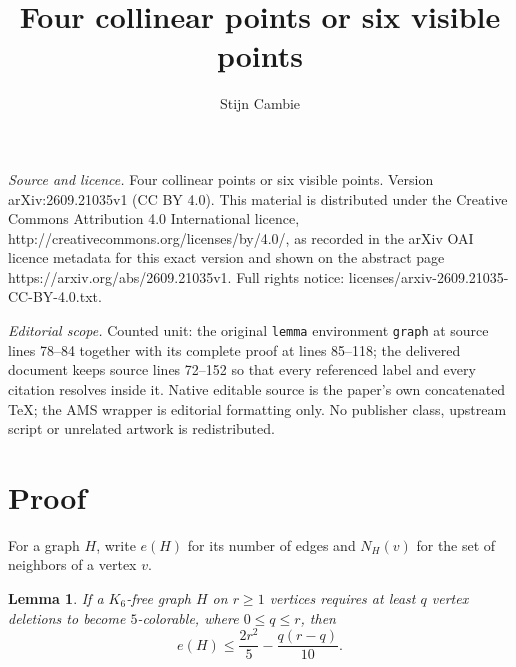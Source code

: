 \documentclass[10pt,a4paper]{amsart}
\newtheorem{lemma}[theorem]{Lemma}
\begin{document}
\title[Four collinear points or six visible points]{Four collinear points or six visible points}
\author{Stijn Cambie}
\date{}
\maketitle
\noindent\emph{Source and licence.} Four collinear points or six visible points. Version arXiv:2609.21035v1 (CC BY 4.0). This material is distributed under the Creative Commons Attribution 4.0 International licence, http://creativecommons.org/licenses/by/4.0/, as recorded in the arXiv OAI licence metadata for this exact version and shown on the abstract page https://arxiv.org/abs/2609.21035v1. Full rights notice: licenses/arxiv-2609.21035-CC-BY-4.0.txt.\par\smallskip
\noindent\textit{Editorial scope.} Counted unit: the original \texttt{lemma} environment \texttt{graph} at source lines 78--84 together with its complete proof at lines 85--118; the delivered document keeps source lines 72--152 so that every referenced label and every citation resolves inside it. Native editable source is the paper's own concatenated TeX; the AMS wrapper is editorial formatting only. No publisher class, upstream script or unrelated artwork is redistributed.
\section{Proof}

For a graph $H$, write $e(H)$ for its number of edges and $N_H(v)$ for
the set of neighbors of a vertex $v$.



\begin{lemma}\label{graph}
If a $K_6$-free graph $H$ on $r\ge1$ vertices requires at least $q$ vertex deletions
to become $5$-colorable, where $0\le q\le r$, then
\[
             e(H)\le\frac{2r^2}{5}-\frac{q(r-q)}{10}.
\]
\end{lemma}
\end{document}
